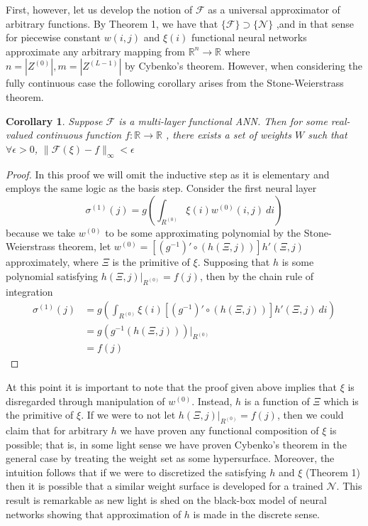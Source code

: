 \documentclass{article}
\newtheorem{corollary}[theorem]{Corollary}
\begin{document}
First, however, let us develop the notion of $\mathcal{F}$ as a universal approximator of arbitrary functions. By Theorem 1, we have that $\{\mathcal{F}\} \supset \{\mathcal{N}\}$ ,and in that sense for piecewise constant $w(i,j)$ and $\xi(i)$ functional neural networks approximate any arbitrary mapping from $\mathbb{R}^n \to \mathbb{R}$ where $n = |Z^{(0)}|, m = |Z^{(L-1)}|$ by Cybenko's theorem. However, when considering the fully continuous case the following corollary arises from the Stone-Weierstrass theorem.
\begin{corollary}
Suppose $\mathcal{F}$  is a multi-layer functional ANN. Then for some real-valued continuous function $f:\mathbb{R} \to \mathbb{R}$ , there exists a set of weights $W$ such that  $\forall \epsilon > 0$, $\|\mathcal{F}(\xi) - f\|_\infty < \epsilon$
\end{corollary}
\begin{proof}
In this proof we will omit the inductive step as it is elementary and employs the same logic as the basis step. Consider the first neural layer
\begin{equation}\sigma^{(1)}(j) = g\left(\int_{R^{(0)}}   \xi(i) w^{(0)}(i,j) \ di\right)\end{equation}
because we take $w^{(0)}$ to be some approximating polynomial by the Stone-Weierstrass theorem, let $w^{(0)} = \left[(g^{-1})' \circ\left(h(\Xi,j)\right)\right]h'(\Xi,j)$ approximately, where $\Xi$ is the primitive of $\xi$. Supposing that $h$ is some polynomial satisfying $h(\Xi,j)\Big|_{R^{(0)}} = f(j)$, then by the chain rule of integration
\begin{equation}
    \begin{aligned}
    \sigma^{(1)}(j) &=g\left(\int_{R^{(0)}}   \xi(i)  \left[(g^{-1})' \circ\left(h(\Xi,j)\right)\right]h'(\Xi,j)\ di\right) \\
    &= g\left(g^{-1}\left(h(\Xi,j)\right)\right)\Bigg|_{R^{(0)}} \\
    &= f(j)
    \end{aligned}
\end{equation}
\end{proof}



At this point it is important to note that the proof given above implies that $\xi$ is disregarded through manipulation of $w^{(0)}$. Instead, $h$ is a function of $\Xi$ which is the primitive of $\xi$. If we were to not let $h(\Xi,j)\Big|_{R^{(0)}} = f(j)$, then we could claim that for arbitrary $h$ we have proven any functional composition of $\xi$ is possible; that is, in some light sense we have proven Cybenko's theorem in the general case by treating the weight set as some hypersurface. Moreover, the intuition follows that if we were to discretized the satisfying $h$ and $\xi$ (Theorem 1) then it is possible that a similar weight surface is developed for a trained $\mathcal{N}$. This result is remarkable as new light is shed on the black-box model of neural networks showing that approximation of $h$ is made in the discrete sense. 
\end{document}
